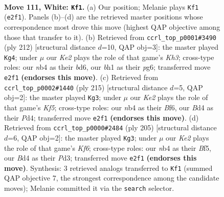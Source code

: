 \documentclass[11pt]{article}
\begin{document}
\clearpage

\begin{figure}[p]\centering
\begin{subfigure}{0.46\textwidth}\centering
\resizebox{\linewidth}{!}{%
\newchessgame
\chessboard[
  setfen={8/8/8/7k/1n1B4/8/4KP2/7b w - - 67 111},
  showmover=false,
  pgfstyle=straightmove, color=movearrow, markmove={e2-f1}
]}
\caption{}
\end{subfigure}\hfill
\begin{subfigure}{0.46\textwidth}\centering
\resizebox{\linewidth}{!}{%
\newchessgame
\chessboard[
  setfen={8/1P4k1/3b2p1/8/7P/5B1K/8/8 w - - 7 107},
  showmover=false,
  pgfstyle=straightmove, color=movearrow, markmove={h3-g4}
]}
\caption{}
\end{subfigure}
\\[4pt]
\begin{subfigure}{0.46\textwidth}\centering
\resizebox{\linewidth}{!}{%
\newchessgame
\chessboard[
  setfen={8/1B6/5b2/8/3p1kp1/8/4K3/8 b - - 9 108},
  showmover=false,
  pgfstyle=straightmove, color=movearrow, markmove={f4-g3}
]}
\caption{}
\end{subfigure}\hfill
\begin{subfigure}{0.46\textwidth}\centering
\resizebox{\linewidth}{!}{%
\newchessgame
\chessboard[
  setfen={8/8/8/2B2b2/8/3p1k2/6p1/4K3 b - - 13 103},
  showmover=false,
  pgfstyle=straightmove, color=movearrow, markmove={f3-g3}
]}
\caption{}
\end{subfigure}
\caption{\textbf{Move 111, White: \texttt{Kf1}.} (a) Our position; Melanie plays \texttt{Kf1} (\texttt{e2f1}). Panels (b)--(d) are the retrieved master positions whose correspondence most drove this move (highest QAP objective among those that transfer to it). (b) Retrieved from \texttt{ccrl\_top\_p0001\#3490} (ply 212) [structural distance $d$=10, QAP obj=3]: the master played \texttt{Kg4}; under $\mu$ our \emph{Ke2} plays the role of that game's \emph{Kh3}; cross-type roles: our \emph{n}b4 as their \emph{b}d6, our \emph{b}h1 as their \emph{p}g6; transferred move \texttt{e2f1} \textbf{(endorses this move)}. (c) Retrieved from \texttt{ccrl\_top\_p0002\#1440} (ply 215) [structural distance $d$=5, QAP obj=2]: the master played \texttt{Kg3}; under $\mu$ our \emph{Ke2} plays the role of that game's \emph{Kf5}; cross-type roles: our \emph{n}b4 as their \emph{B}f6, our \emph{B}d4 as their \emph{P}d4; transferred move \texttt{e2f1} \textbf{(endorses this move)}. (d) Retrieved from \texttt{ccrl\_top\_p0000\#2484} (ply 205) [structural distance $d$=6, QAP obj=2]: the master played \texttt{Kg3}; under $\mu$ our \emph{Ke2} plays the role of that game's \emph{Kf6}; cross-type roles: our \emph{n}b4 as their \emph{B}f5, our \emph{B}d4 as their \emph{P}d3; transferred move \texttt{e2f1} \textbf{(endorses this move)}. Synthesis: 3 retrieved analogs transferred to \texttt{Kf1} (summed QAP objective 7, the strongest correspondence among the candidate moves); Melanie committed it via the \texttt{search} selector.}
\label{fig:thought-m220}
\end{figure}
\end{document}
